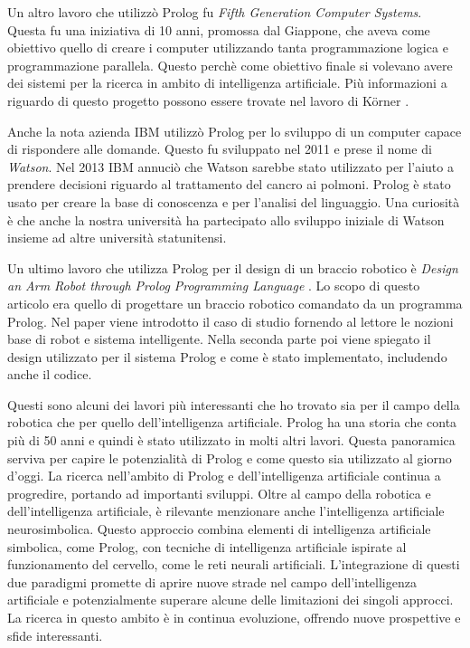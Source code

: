 Un altro lavoro che utilizzò Prolog fu \textit{Fifth Generation Computer Systems}. Questa fu una iniziativa di 10 anni, promossa dal Giappone, che aveva come obiettivo quello di creare i computer utilizzando tanta programmazione logica e programmazione parallela.
Questo perchè come obiettivo finale si volevano avere dei sistemi per la ricerca in ambito di intelligenza artificiale. Più informazioni a riguardo di questo progetto possono essere trovate nel lavoro di K\"orner \cite{korner2022fifty}.

Anche la nota azienda IBM utilizzò Prolog per lo sviluppo di un computer capace di rispondere alle domande. Questo fu sviluppato nel 2011 e prese il nome di \textit{Watson}. Nel 2013 IBM annuciò che Watson sarebbe stato utilizzato per l'aiuto a prendere decisioni riguardo al trattamento del cancro ai polmoni. Prolog è stato usato per creare la base di conoscenza e per l'analisi del linguaggio.
Una curiosità è che anche la nostra università ha partecipato allo sviluppo iniziale di Watson insieme ad altre università statunitensi. %

Un ultimo lavoro che utilizza Prolog per il design di un braccio robotico è \textit{Design an Arm Robot through Prolog Programming Language} \cite{mustafa2013design}. Lo scopo di questo articolo era quello di progettare un braccio robotico comandato da un programma Prolog. Nel paper viene introdotto il caso di studio fornendo al lettore le nozioni base di robot e sistema intelligente.
Nella seconda parte poi viene spiegato il design utilizzato per il sistema Prolog e come è stato implementato, includendo anche il codice.

Questi sono alcuni dei lavori più interessanti che ho trovato sia per il campo della robotica che per quello dell'intelligenza artificiale. Prolog ha una storia che conta più di 50 anni e quindi è stato utilizzato in molti altri lavori. Questa panoramica serviva per capire le potenzialità di Prolog
e come questo sia utilizzato al giorno d'oggi. La ricerca nell'ambito di Prolog e dell'intelligenza artificiale continua a progredire, portando ad importanti sviluppi. Oltre al campo della robotica e dell'intelligenza artificiale, è rilevante menzionare anche l'intelligenza artificiale neurosimbolica. Questo approccio combina elementi di intelligenza artificiale simbolica, come Prolog, con tecniche di intelligenza artificiale ispirate al funzionamento del cervello, come le reti neurali artificiali. L'integrazione di questi due paradigmi promette di aprire nuove strade nel campo dell'intelligenza artificiale e potenzialmente superare alcune delle limitazioni dei singoli approcci. La ricerca in questo ambito è in continua evoluzione, offrendo nuove prospettive e sfide interessanti.

